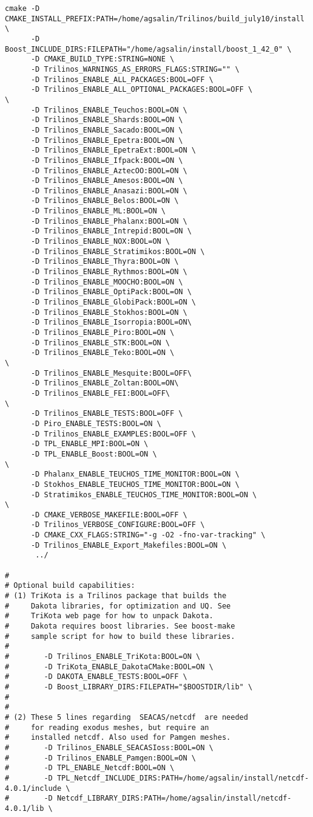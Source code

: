 \documentclass[pdf,12pt,report,strict]{SANDreport}
\theoremstyle{remark}
\begin{document}
\begin{verbatim}
cmake -D CMAKE_INSTALL_PREFIX:PATH=/home/agsalin/Trilinos/build_july10/install \
      -D Boost_INCLUDE_DIRS:FILEPATH="/home/agsalin/install/boost_1_42_0" \
      -D CMAKE_BUILD_TYPE:STRING=NONE \
      -D Trilinos_WARNINGS_AS_ERRORS_FLAGS:STRING="" \
      -D Trilinos_ENABLE_ALL_PACKAGES:BOOL=OFF \
      -D Trilinos_ENABLE_ALL_OPTIONAL_PACKAGES:BOOL=OFF \
\
      -D Trilinos_ENABLE_Teuchos:BOOL=ON \
      -D Trilinos_ENABLE_Shards:BOOL=ON \
      -D Trilinos_ENABLE_Sacado:BOOL=ON \
      -D Trilinos_ENABLE_Epetra:BOOL=ON \
      -D Trilinos_ENABLE_EpetraExt:BOOL=ON \
      -D Trilinos_ENABLE_Ifpack:BOOL=ON \
      -D Trilinos_ENABLE_AztecOO:BOOL=ON \
      -D Trilinos_ENABLE_Amesos:BOOL=ON \
      -D Trilinos_ENABLE_Anasazi:BOOL=ON \
      -D Trilinos_ENABLE_Belos:BOOL=ON \
      -D Trilinos_ENABLE_ML:BOOL=ON \
      -D Trilinos_ENABLE_Phalanx:BOOL=ON \
      -D Trilinos_ENABLE_Intrepid:BOOL=ON \
      -D Trilinos_ENABLE_NOX:BOOL=ON \
      -D Trilinos_ENABLE_Stratimikos:BOOL=ON \
      -D Trilinos_ENABLE_Thyra:BOOL=ON \
      -D Trilinos_ENABLE_Rythmos:BOOL=ON \
      -D Trilinos_ENABLE_MOOCHO:BOOL=ON \
      -D Trilinos_ENABLE_OptiPack:BOOL=ON \
      -D Trilinos_ENABLE_GlobiPack:BOOL=ON \
      -D Trilinos_ENABLE_Stokhos:BOOL=ON \
      -D Trilinos_ENABLE_Isorropia:BOOL=ON\
      -D Trilinos_ENABLE_Piro:BOOL=ON \
      -D Trilinos_ENABLE_STK:BOOL=ON \
      -D Trilinos_ENABLE_Teko:BOOL=ON \
\
      -D Trilinos_ENABLE_Mesquite:BOOL=OFF\
      -D Trilinos_ENABLE_Zoltan:BOOL=ON\
      -D Trilinos_ENABLE_FEI:BOOL=OFF\
\
      -D Trilinos_ENABLE_TESTS:BOOL=OFF \
      -D Piro_ENABLE_TESTS:BOOL=ON \
      -D Trilinos_ENABLE_EXAMPLES:BOOL=OFF \
      -D TPL_ENABLE_MPI:BOOL=ON \
      -D TPL_ENABLE_Boost:BOOL=ON \
\
      -D Phalanx_ENABLE_TEUCHOS_TIME_MONITOR:BOOL=ON \
      -D Stokhos_ENABLE_TEUCHOS_TIME_MONITOR:BOOL=ON \
      -D Stratimikos_ENABLE_TEUCHOS_TIME_MONITOR:BOOL=ON \
\
      -D CMAKE_VERBOSE_MAKEFILE:BOOL=OFF \
      -D Trilinos_VERBOSE_CONFIGURE:BOOL=OFF \
      -D CMAKE_CXX_FLAGS:STRING="-g -O2 -fno-var-tracking" \
      -D Trilinos_ENABLE_Export_Makefiles:BOOL=ON \
       ../

#
# Optional build capabilities:
# (1) TriKota is a Trilinos package that builds the
#     Dakota libraries, for optimization and UQ. See
#     TriKota web page for how to unpack Dakota.
#     Dakota requires boost libraries. See boost-make
#     sample script for how to build these libraries.
#
#        -D Trilinos_ENABLE_TriKota:BOOL=ON \
#        -D TriKota_ENABLE_DakotaCMake:BOOL=ON \
#        -D DAKOTA_ENABLE_TESTS:BOOL=OFF \
#        -D Boost_LIBRARY_DIRS:FILEPATH="$BOOSTDIR/lib" \
#
#
# (2) These 5 lines regarding  SEACAS/netcdf  are needed
#     for reading exodus meshes, but require an
#     installed netcdf. Also used for Pamgen meshes.
#        -D Trilinos_ENABLE_SEACASIoss:BOOL=ON \
#        -D Trilinos_ENABLE_Pamgen:BOOL=ON \
#        -D TPL_ENABLE_Netcdf:BOOL=ON \
#        -D TPL_Netcdf_INCLUDE_DIRS:PATH=/home/agsalin/install/netcdf-4.0.1/include \
#        -D Netcdf_LIBRARY_DIRS:PATH=/home/agsalin/install/netcdf-4.0.1/lib \
\end{verbatim}
\end{document}
